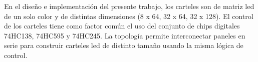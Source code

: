 En el diseño e implementación del presente trabajo, los carteles son de matriz led de un solo color y de distintas dimensiones (8 x 64, 32 x 64, 32 x 128). El control de los carteles tiene como factor común el uso del conjunto de chips digitales 74HC138, 74HC595 y 74HC245. La topología permite interconectar paneles en serie para construir carteles led de distinto tamaño usando la misma lógica de control. \\


